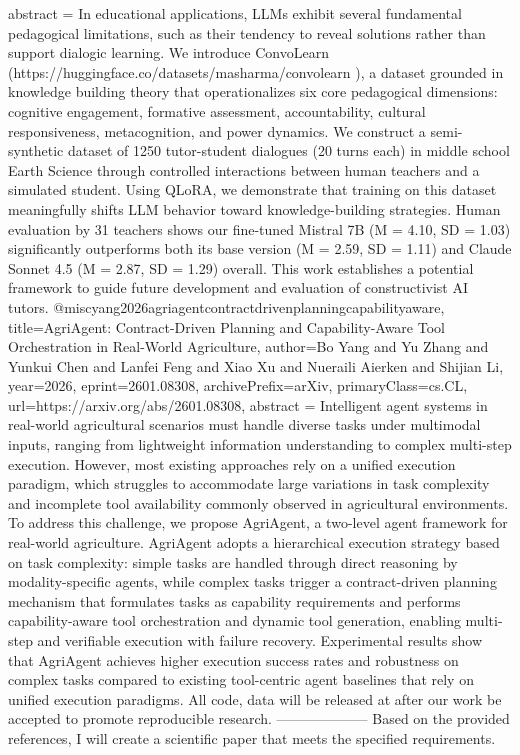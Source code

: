 {      abstract = {In educational applications, LLMs exhibit several fundamental pedagogical limitations, such as their tendency to reveal solutions rather than support dialogic learning. We introduce ConvoLearn (https://huggingface.co/datasets/masharma/convolearn ), a dataset grounded in knowledge building theory that operationalizes six core pedagogical dimensions: cognitive engagement, formative assessment, accountability, cultural responsiveness, metacognition, and power dynamics. We construct a semi-synthetic dataset of 1250 tutor-student dialogues (20 turns each) in middle school Earth Science through controlled interactions between human teachers and a simulated student. Using QLoRA, we demonstrate that training on this dataset meaningfully shifts LLM behavior toward knowledge-building strategies. Human evaluation by 31 teachers shows our fine-tuned Mistral 7B (M = 4.10, SD = 1.03) significantly outperforms both its base version (M = 2.59, SD = 1.11) and Claude Sonnet 4.5 (M = 2.87, SD = 1.29) overall. This work establishes a potential framework to guide future development and evaluation of constructivist AI tutors.}
}@misc{yang2026agriagentcontractdrivenplanningcapabilityaware,
      title={AgriAgent: Contract-Driven Planning and Capability-Aware Tool Orchestration in Real-World Agriculture}, 
      author={Bo Yang and Yu Zhang and Yunkui Chen and Lanfei Feng and Xiao Xu and Nueraili Aierken and Shijian Li},
      year={2026},
      eprint={2601.08308},
      archivePrefix={arXiv},
      primaryClass={cs.CL},
      url={https://arxiv.org/abs/2601.08308},
      abstract = {Intelligent agent systems in real-world agricultural scenarios must handle diverse tasks under multimodal inputs, ranging from lightweight information understanding to complex multi-step execution. However, most existing approaches rely on a unified execution paradigm, which struggles to accommodate large variations in task complexity and incomplete tool availability commonly observed in agricultural environments. To address this challenge, we propose AgriAgent, a two-level agent framework for real-world agriculture. AgriAgent adopts a hierarchical execution strategy based on task complexity: simple tasks are handled through direct reasoning by modality-specific agents, while complex tasks trigger a contract-driven planning mechanism that formulates tasks as capability requirements and performs capability-aware tool orchestration and dynamic tool generation, enabling multi-step and verifiable execution with failure recovery. Experimental results show that AgriAgent achieves higher execution success rates and robustness on complex tasks compared to existing tool-centric agent baselines that rely on unified execution paradigms. All code, data will be released at after our work be accepted to promote reproducible research.}
}
        --------------------
         Based on the provided references, I will create a scientific paper that meets the specified requirements.

